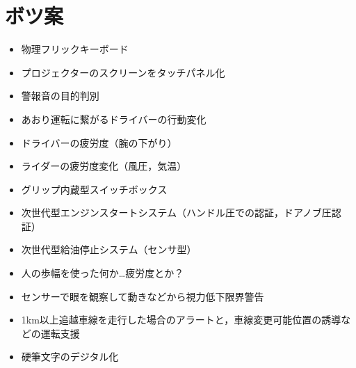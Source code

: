 \documentclass[a4j,twocolumn,10pt]{jarticle}
\begin{document}
\section{ボツ案}
\begin{itemize}
  \item 物理フリックキーボード
  \item プロジェクターのスクリーンをタッチパネル化
  \item 警報音の目的判別
  \item あおり運転に繋がるドライバーの行動変化
  \item ドライバーの疲労度（腕の下がり）
  \item ライダーの疲労度変化（風圧，気温）
  \item グリップ内蔵型スイッチボックス
  \item 次世代型エンジンスタートシステム（ハンドル圧での認証，ドアノブ圧認証）
  \item 次世代型給油停止システム（センサ型）
  \item 人の歩幅を使った何か…疲労度とか？
  \item センサーで眼を観察して動きなどから視力低下限界警告
  \item 1km以上追越車線を走行した場合のアラートと，車線変更可能位置の誘導などの運転支援
  \item 硬筆文字のデジタル化
\end{itemize}

\end{document}
